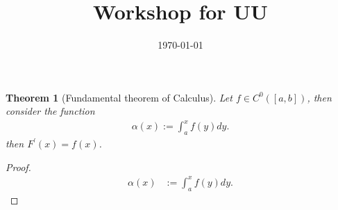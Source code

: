 \documentclass[reqno]{amsart}
\title{Workshop for UU}
\author{}
\date{\today}
\newtheorem{theorem}{Theorem}
\newcommand{\<}{\langle}
\renewcommand{\>}{\rangle}
\renewcommand{\>}{\rangle}
\begin{document}
\maketitle

\begin{theorem}[Fundamental theorem of Calculus]
  Let $f \in C^0([a,b])$, then consider the function
%
\begin{align*}
  \alpha(x):=
  \int_{a}^x f(y)  dy.
\end{align*}
% 
then $F^\prime(x)=f(x)$. 

\end{theorem}
\begin{proof}
\begin{align*}
  \alpha(x)
&:=
  \int_{a}^x f(y)  dy.
\end{align*}

\end{proof}


%
%
\end{document}
